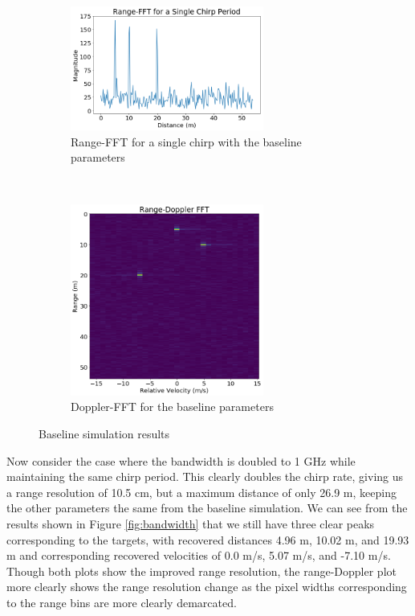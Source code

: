 \begin{figure}[h]
	\centering 
	\begin{subfigure}[c]{0.5\textwidth}
		\centering
		\includegraphics[width=2.5in]{imgs/baseline_range}
		\caption{Range-FFT for a single chirp with the baseline
		parameters}
	\end{subfigure}%
	~
	\begin{subfigure}[c]{0.5\textwidth}
		\centering
		\includegraphics[width=2.5in]{imgs/baseline_doppler}
		\caption{Doppler-FFT for the baseline parameters}
	\end{subfigure}
	\caption{Baseline simulation results}
	\label{fig:baseline}
\end{figure}

Now consider the case where the bandwidth is doubled to 1 GHz while
maintaining the same chirp period. This clearly doubles the chirp rate, giving
us a range resolution of 10.5 cm, but a maximum distance of only 26.9 m, keeping
the other parameters the same from the baseline simulation. We can see from the
results shown in Figure \ref{fig:bandwidth} that we still have three clear
peaks corresponding to the targets, with recovered distances 4.96 m, 10.02 m,
and 19.93 m and corresponding recovered velocities of 0.0 m/s, 5.07 m/s, and
-7.10 m/s. Though both plots show the improved range resolution, the
range-Doppler plot more clearly shows the range resolution change as the pixel
widths corresponding to the range bins are more clearly demarcated.  

